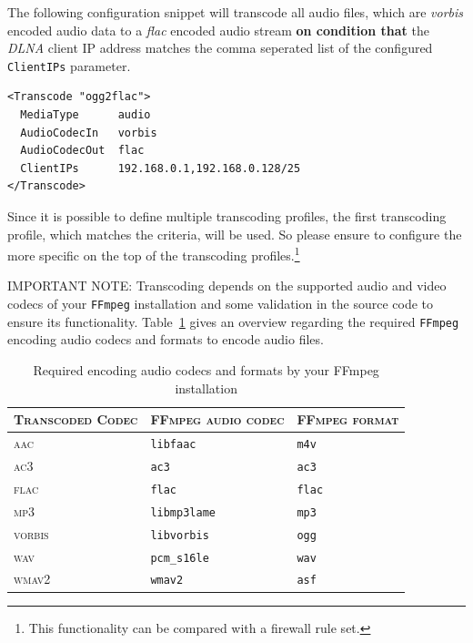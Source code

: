 \documentclass[a4paper,oneside,10pt]{report}
\newenvironment{colframefile}{%
  \begin{Sbox}
    \begin{minipage}{.99\columnwidth}
}{%
  \end{minipage}
  \end{Sbox}
  \begin{center}
    \fcolorbox{black}{Yellow}{\TheSbox}
  \end{center}
}
\newenvironment{colframeimportantnote}{%
  \begin{Sbox}
    \begin{minipage}{.99\columnwidth}
}{%
  \end{minipage}
  \end{Sbox}
  \begin{center}
    \fcolorbox{black}{Orange}{\TheSbox}
  \end{center}
}
\begin{document}
The following configuration snippet will transcode all audio files, which are {\em vorbis} encoded audio data to a {\em flac} encoded audio stream \textbf{on condition that} the {\em DLNA} client IP address matches the comma seperated list of the configured \verb|ClientIPs| parameter.

\begin{colframefile}
\begin{verbatim}
<Transcode "ogg2flac">
  MediaType      audio
  AudioCodecIn   vorbis
  AudioCodecOut  flac
  ClientIPs      192.168.0.1,192.168.0.128/25
</Transcode>
\end{verbatim}
\end{colframefile}

Since it is possible to define multiple transcoding profiles, the first transcoding profile, which matches the criteria, will be used. So please ensure to configure the more specific on the top of the transcoding profiles.\footnote{This functionality can be compared with a firewall rule set.}

\begin{colframeimportantnote}
\textsc{IMPORTANT NOTE:} Transcoding depends on the supported audio and video codecs of your \verb|FFmpeg| installation and some validation in the source code to ensure its functionality. Table~\ref{tab:requiredffmpegaudio} gives an overview regarding the required \verb|FFmpeg| encoding audio codecs and formats to encode audio files.
\end{colframeimportantnote}

\begin{table}
	\centering
	\begin{tabular}{|p{10em}|p{11em}|p{10em}|}
		\hline
		\textsc{Transcoded Codec} & \textsc{FFmpeg audio codec} & \textsc{FFmpeg format} \\
		\hline
		\hline
		\textsc{aac} 							& \verb|libfaac| 							& \verb|m4v| \\
		\hline
		\textsc{ac3} 							& \verb|ac3|									& \verb|ac3| \\
		\hline
		\textsc{flac} 						& \verb|flac|									& \verb|flac| \\
		\hline
		\textsc{mp3} 							& \verb|libmp3lame|						& \verb|mp3| \\
		\hline
		\textsc{vorbis} 					& \verb|libvorbis|						& \verb|ogg| \\
		\hline
		\textsc{wav} 							& \verb|pcm_s16le|						& \verb|wav| \\
		\hline
		\textsc{wmav2} 						& \verb|wmav2|								& \verb|asf| \\
		\hline
	\end{tabular}
	\caption{Required encoding audio codecs and formats by your FFmpeg installation}
	\label{tab:requiredffmpegaudio}
\end{table}
\end{document}
